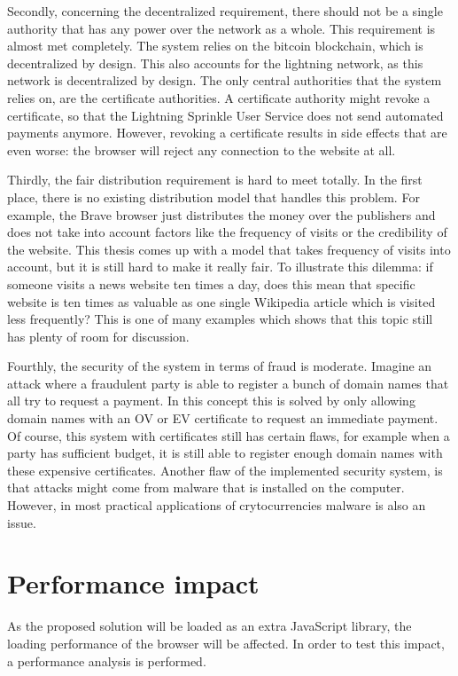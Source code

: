 Secondly, concerning the decentralized requirement, there should not be a single authority that has any power over the network as a whole. This requirement is almost met completely. The system relies on the bitcoin blockchain, which is decentralized by design. This also accounts for the lightning network, as this network is decentralized by design. The only central authorities that the system relies on, are the certificate authorities. A certificate authority might revoke a certificate, so that the Lightning Sprinkle User Service does not send automated payments anymore. However, revoking a certificate results in side effects that are even worse: the browser will reject any connection to the website at all.

Thirdly, the fair distribution requirement is hard to meet totally. In the first place, there is no existing distribution model that handles this problem. For example, the Brave browser just distributes the money over the publishers and does not take into account factors like the frequency of visits or the credibility of the website. This thesis comes up with a model that takes frequency of visits into account, but it is still hard to make it really fair. To illustrate this dilemma: if someone visits a news website ten times a day, does this mean that specific website is ten times as valuable as one single Wikipedia article which is visited less frequently? This is one of many examples which shows that this topic still has plenty of room for discussion. 


Fourthly, the security of the system in terms of fraud is moderate. Imagine an attack where a fraudulent party is able to register a bunch of domain names that all try to request a payment. In this concept this is solved by only allowing domain names with an OV or EV certificate to request an immediate payment. Of course, this system with certificates still has certain flaws, for example when a party has sufficient budget, it is still able to register enough domain names with these expensive certificates. Another flaw of the implemented security system, is that attacks might come from malware that is installed on the computer. However, in most practical applications of crytocurrencies malware is also an issue.


\section{Performance impact}
As the proposed solution will be loaded as an extra JavaScript library, the loading performance of the browser will be affected. In order to test this impact, a performance analysis is performed.

